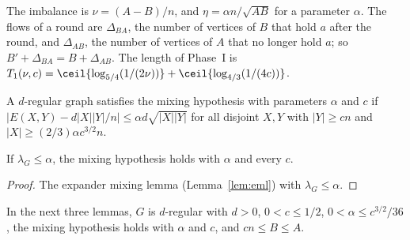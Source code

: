 \begin{definition}\label{def:cer-imbalance}
\leanok{}
The imbalance is $\nu=(A-B)/n$, and $\eta=\alpha n/\sqrt{AB}$ for a parameter $\alpha$. The flows
of a round are $\Delta_{BA}$, the number of vertices of $B$ that hold $a$ after the round, and
$\Delta_{AB}$, the number of vertices of $A$ that no longer hold $a$; so
$B'+\Delta_{BA}=B+\Delta_{AB}$. The length of Phase~I is
$T_1(\nu,c)=\ceil{\log_{5/4}(1/(2\nu))}+\ceil{\log_{4/3}(1/(4c))}$.
\end{definition}

\begin{definition}\label{def:cer-mixing-prop}
\leanok{}
A $d$-regular graph satisfies the mixing hypothesis with parameters $\alpha$ and $c$ if
$|E(X,Y)-d|X||Y|/n|\le\alpha d\sqrt{|X||Y|}$ for all disjoint $X,Y$ with $|Y|\ge cn$ and
$|X|\ge(2/3)\alpha c^{3/2}n$.
\end{definition}

\begin{lemma}[Lemma~3]\label{lem:cer-mixing-prop}
\leanok{}
If $\lambda_G\le\alpha$, the mixing hypothesis holds with $\alpha$ and every $c$.
\end{lemma}
\begin{proof}\leanok
The expander mixing lemma (Lemma~\ref{lem:eml}) with $\lambda_G\le\alpha$.
\end{proof}

In the next three lemmas, $G$ is $d$-regular with $d>0$, $0<c\le1/2$,
$0<\alpha\le c^{3/2}/36$, the mixing hypothesis holds with $\alpha$ and $c$, and $cn\le B\le A$.

